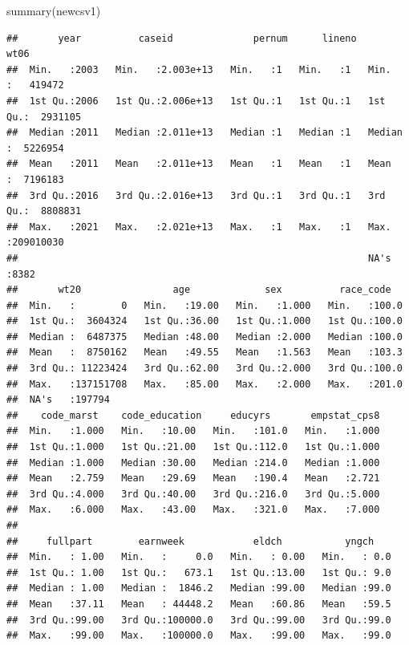 \documentclass[
]{article}
\newenvironment{Shaded}{\begin{snugshade}}{\end{snugshade}}
\newcommand{\FunctionTok}[1]{\textcolor[rgb]{0.00,0.00,0.00}{#1}}
\newcommand{\NormalTok}[1]{#1}
\begin{document}
\begin{Shaded}
\begin{Highlighting}[]
\FunctionTok{summary}\NormalTok{(newcsv1)}
\end{Highlighting}
\end{Shaded}

\begin{verbatim}
##       year          caseid              pernum      lineno       wt06          
##  Min.   :2003   Min.   :2.003e+13   Min.   :1   Min.   :1   Min.   :   419472  
##  1st Qu.:2006   1st Qu.:2.006e+13   1st Qu.:1   1st Qu.:1   1st Qu.:  2931105  
##  Median :2011   Median :2.011e+13   Median :1   Median :1   Median :  5226954  
##  Mean   :2011   Mean   :2.011e+13   Mean   :1   Mean   :1   Mean   :  7196183  
##  3rd Qu.:2016   3rd Qu.:2.016e+13   3rd Qu.:1   3rd Qu.:1   3rd Qu.:  8808831  
##  Max.   :2021   Max.   :2.021e+13   Max.   :1   Max.   :1   Max.   :209010030  
##                                                             NA's   :8382       
##       wt20                age             sex          race_code    
##  Min.   :        0   Min.   :19.00   Min.   :1.000   Min.   :100.0  
##  1st Qu.:  3604324   1st Qu.:36.00   1st Qu.:1.000   1st Qu.:100.0  
##  Median :  6487375   Median :48.00   Median :2.000   Median :100.0  
##  Mean   :  8750162   Mean   :49.55   Mean   :1.563   Mean   :103.3  
##  3rd Qu.: 11223424   3rd Qu.:62.00   3rd Qu.:2.000   3rd Qu.:100.0  
##  Max.   :137151708   Max.   :85.00   Max.   :2.000   Max.   :201.0  
##  NA's   :197794                                                     
##    code_marst    code_education     educyrs       empstat_cps8  
##  Min.   :1.000   Min.   :10.00   Min.   :101.0   Min.   :1.000  
##  1st Qu.:1.000   1st Qu.:21.00   1st Qu.:112.0   1st Qu.:1.000  
##  Median :1.000   Median :30.00   Median :214.0   Median :1.000  
##  Mean   :2.759   Mean   :29.69   Mean   :190.4   Mean   :2.721  
##  3rd Qu.:4.000   3rd Qu.:40.00   3rd Qu.:216.0   3rd Qu.:5.000  
##  Max.   :6.000   Max.   :43.00   Max.   :321.0   Max.   :7.000  
##                                                                 
##     fullpart        earnweek            eldch           yngch     
##  Min.   : 1.00   Min.   :     0.0   Min.   : 0.00   Min.   : 0.0  
##  1st Qu.: 1.00   1st Qu.:   673.1   1st Qu.:13.00   1st Qu.: 9.0  
##  Median : 1.00   Median :  1846.2   Median :99.00   Median :99.0  
##  Mean   :37.11   Mean   : 44448.2   Mean   :60.86   Mean   :59.5  
##  3rd Qu.:99.00   3rd Qu.:100000.0   3rd Qu.:99.00   3rd Qu.:99.0  
##  Max.   :99.00   Max.   :100000.0   Max.   :99.00   Max.   :99.0  

\end{verbatim}
\end{document}
